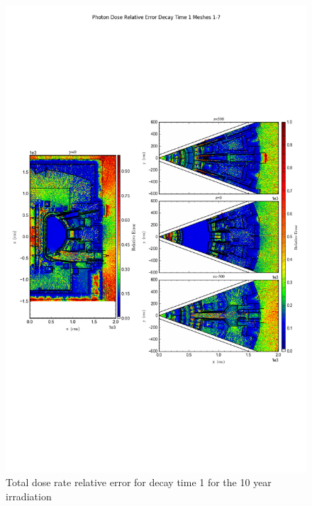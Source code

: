 \documentclass[12pt]{article}
\begin{document}
\begin{figure}[ht!]
\centering
\includegraphics[trim={0cm 8cm, 0cm 8cm},clip,scale=0.75]{../plots/final_model_with_b4c/10year/Photon_Dose_Relative_Error_Decay_Time_1_Meshes_1-7.png}
\caption{Total dose rate relative error for decay time 1 for the 10 year irradiation}
\label{fig:photons_10y_dc1_b4c_relerr}
\end{figure}
\clearpage
\end{document}
